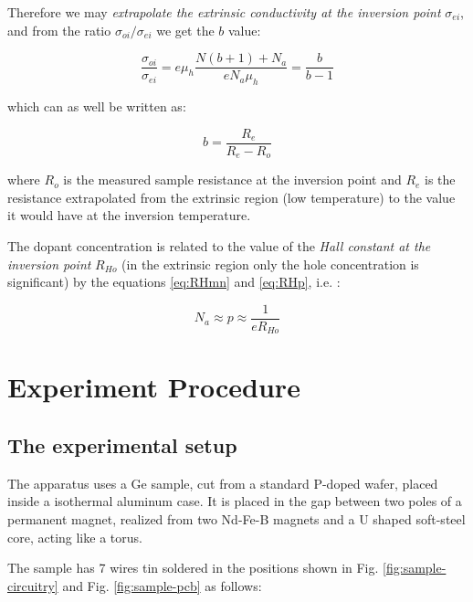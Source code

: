 \documentclass[]{book}
\begin{document}
Therefore we may \emph{extrapolate the extrinsic conductivity at the
inversion point} \(\sigma_{ei}\), and from the ratio
\({\sigma_{oi}}/{\sigma_{ei}}\) we get the \(b\) value:

\begin{equation}
\frac{\sigma_{oi}}{\sigma_{ei}} =e\mu_h \frac{N(b+1) + N_a}{e N_a \mu_h}= \frac{b}{b-1}
\label{eq:extrinsicConductivityInvPoint}
\end{equation}

which can as well be written as:

\begin{equation}
b=\frac{R_e}{R_e-R_o}
\label{eq:extrinsicConductivityInvPoint2}
\end{equation}

where \(R_o\) is the measured sample resistance at the inversion point
and \(R_e\) is the resistance extrapolated from the extrinsic region
(low temperature) to the value it would have at the inversion
temperature.

The dopant concentration is related to the value of the \emph{Hall
constant at the inversion point} \(R_{Ho}\) (in the extrinsic region
only the hole concentration is significant) by the equations
\eqref{eq:RHmn} and \eqref{eq:RHp}, i.e. :

\begin{equation}
N_a \approx p \approx \frac{1}{e R_{Ho}}
\label{eq:HallConstantInvPointRelation}
\end{equation}

\chapter{Experiment Procedure}\label{experiment-procedure}

\section{The experimental setup}\label{the-experimental-setup}

The apparatus uses a Ge sample, cut from a standard P-doped wafer,
placed inside a isothermal aluminum case. It is placed in the gap
between two poles of a permanent magnet, realized from two Nd-Fe-B
magnets and a U shaped soft-steel core, acting like a torus.

The sample has 7 wires tin soldered in the positions shown in Fig.
\ref{fig:sample-circuitry} and Fig. \ref{fig:sample-pcb} as follows:
\end{document}
